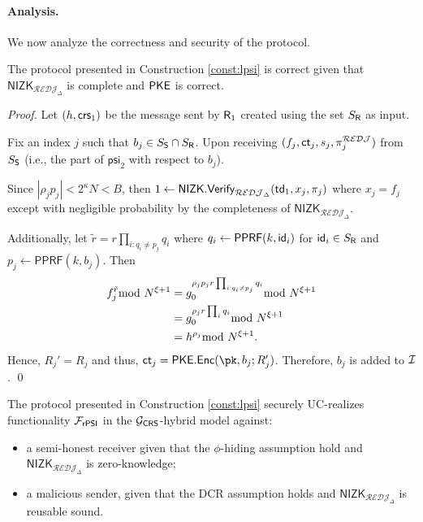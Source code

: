 \paragraph{Analysis.} We now analyze the correctness and security of the protocol.
\begin{theorem}
\label{theor:correctPSI}
The protocol presented in Construction \ref{const:lpsi} is correct given that $\mathsf{NIZK}_{\mathcal{REDJ}_{\Delta}}$ is complete and $\mathsf{PKE}$ is correct.
\end{theorem}
\begin{proof}

Let $(h,\mathsf{crs}_1)$ be the message sent by $\mathsf{R}_1$ created using the set $S_{\mathsf{R}}$ as input. 

Fix an index $j$ such that $b_j\in S_{\mathsf{S}}\cap S_{\mathsf{R}}$. Upon receiving $(f_j,\mathsf{ct}_j,s_j,\pi_j^\mathcal{REDJ})$ from $S_{\mathsf{S}}$ (i.e., the part of $\mathsf{psi}_2$ with respect to $b_j$).

Since $|\rho_jp_j|<2^{\kappa}N<B$, then $1\leftarrow\mathsf{NIZK.Verify}_{\mathcal{REDJ}_{\Delta}}(\mathsf{td}_1,x_j,\pi_j)$ where $x_j=f_j$ except with negligible probability by the completeness of $\mathsf{NIZK}_{\mathcal{REDJ}_\Delta}$.

Additionally, let  $\tilde r=r\prod_{i:q_i\neq p_j} q_i $ where $q_i\leftarrow\mathsf{PPRF}(k,\mathsf{id}_i)$ for $\mathsf{id}_i\in S_{\mathsf{R}}$ and $p_j\leftarrow\mathsf{PPRF}(k,b_j)$. Then \begin{align*}
    f_j^{\tilde r} \smod N^{\xi+1} & = g_0^{\rho_jp_j r \prod_{i:q_i\neq p_j} q_i } \smod N^{\xi+1}\\ 
    & = g_0 ^{\rho_j r \prod_{i} q_i } \smod N^{\xi+1}\\
    & = h ^{\rho_j} \smod N^{\xi+1}.
\end{align*}
Hence, $R_j'=R_j$ and thus, $\ct_j=\mathsf{PKE.Enc}(\pk,b_j;R_j')$. Therefore, $b_j $ is added to $\mathcal{I}$. 
\qed
\end{proof}

\begin{theorem}
\label{theor:securityPSI}
The protocol presented in Construction \ref{const:lpsi} securely UC-realizes functionality $\mathcal{F}_\mathsf{rPSI}$ in the $\mathcal{G}_\mathsf{CRS}$-hybrid model against:
\begin{itemize}
    \item a semi-honest receiver given that the $\phi$-hiding assumption hold and $\mathsf{NIZK}_{\mathcal{REDJ}_{\Delta}}$ is zero-knowledge;
    \item a malicious sender,  given that the DCR assumption holds and $\mathsf{NIZK}_{\mathcal{REDJ}_{\Delta}}$ is reusable sound.
\end{itemize}
\end{theorem}

